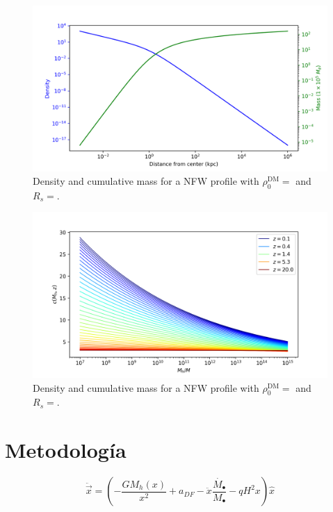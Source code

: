 		\begin{figure}[h]
			\centering
			\includegraphics[width=0.7\linewidth]{"../Files/Week 3/NFW_profile"}
			\caption{Density and cumulative mass for a NFW profile with $\rho_0^\text{DM} = $ and $R_s = $.}
		\end{figure}
	
		\begin{figure}[h]
			\centering
			\includegraphics[width=0.7\linewidth]{"../Files/Week 3/darkmatter_concentration"}
			\caption{Density and cumulative mass for a NFW profile with $\rho_0^\text{DM} = $ and $R_s = $.}
		\end{figure}

		
	
\section{Metodología}
	\begin{equation}
		\ddot{\vec{x}} = \left(-\dfrac{GM_h(x)}{x^2} + a_{DF}-\ddot{x}\dfrac{\dot{M_\bullet}}{M_\bullet} -qH^2x\right)\hat{x}
	\end{equation}
	
